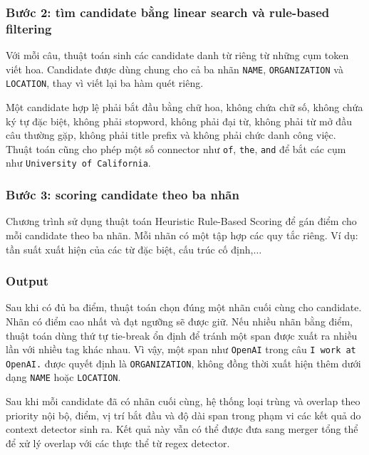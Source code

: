 \subsubsection*{Bước 2: tìm candidate bằng linear search và rule-based filtering}

Với mỗi câu, thuật toán sinh các candidate danh từ riêng từ những cụm token viết
hoa. Candidate được dùng chung cho cả ba nhãn \texttt{NAME},
\texttt{ORGANIZATION} và \texttt{LOCATION}, thay vì viết lại ba hàm quét riêng.

Một candidate hợp lệ phải bắt đầu bằng chữ hoa, không chứa chữ số, không chứa
ký tự đặc biệt, không phải stopword, không phải đại từ, không phải từ mở đầu câu
thường gặp, không phải title prefix và không phải chức danh công việc. Thuật
toán cũng cho phép một số connector như \texttt{of}, \texttt{the},
\texttt{and} để bắt các cụm như \texttt{University of California}.

\subsubsection*{Bước 3: scoring candidate theo ba nhãn}

Chương trình sử dụng thuật toán Heuristic Rule-Based Scoring để gán điểm cho mỗi candidate theo ba nhãn. Mỗi nhãn có một tập hợp các quy tắc riêng. Ví dụ: tần suất xuất hiện của các từ đặc biệt, cấu trúc cố định,$\dots$

\subsubsection*{Output}
Sau khi có đủ ba điểm, thuật toán chọn đúng một nhãn cuối cùng cho candidate.
Nhãn có điểm cao nhất và đạt ngưỡng sẽ được giữ. Nếu nhiều nhãn bằng điểm,
thuật toán dùng thứ tự tie-break ổn định để tránh một span được xuất ra nhiều
lần với nhiều tag khác nhau. Vì vậy, một span như \texttt{OpenAI} trong câu
\texttt{I work at OpenAI.} được quyết định là \texttt{ORGANIZATION}, không đồng
thời xuất hiện thêm dưới dạng \texttt{NAME} hoặc \texttt{LOCATION}.

Sau khi mỗi candidate đã có nhãn cuối cùng, hệ thống loại trùng và overlap theo
priority nội bộ, điểm, vị trí bắt đầu và độ dài span trong phạm vi các kết quả
do context detector sinh ra. Kết quả này vẫn có thể được đưa sang merger tổng
thể để xử lý overlap với các thực thể từ regex detector.

